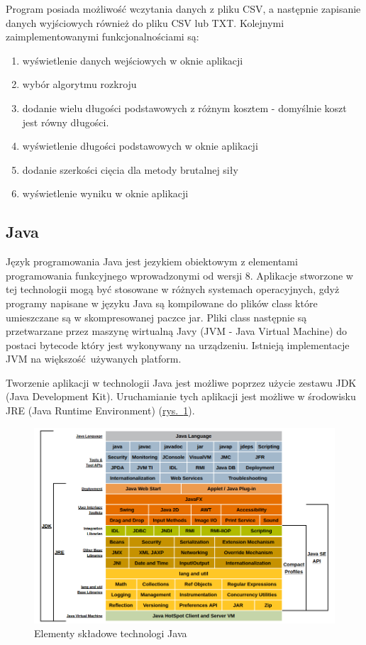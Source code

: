 Program posiada możliwość wczytania danych z pliku CSV, a następnie zapisanie danych wyjściowych również do pliku CSV lub TXT. Kolejnymi zaimplementowanymi funkcjonalnościami są:
\begin{enumerate}
  \item wyświetlenie danych wejściowych w oknie aplikacji
  \item wybór algorytmu rozkroju
  \item dodanie wielu długości podstawowych z różnym kosztem - domyślnie koszt jest równy długości.
  \item wyświetlenie długości podstawowych w oknie aplikacji
  \item dodanie szerkości cięcia dla metody brutalnej siły
  \item wyświetlenie wyniku w oknie aplikacji
\end{enumerate}

\subsection{Java}
Język programowania Java jest jezykiem obiektowym z elementami programowania funkcyjnego wprowadzonymi od wersji 8. Aplikacje stworzone w tej technologii mogą być stosowane w różnych systemach operacyjnych, gdyż programy napisane w języku Java są kompilowane do plików class które umieszczane są w skompresowanej paczce jar. Pliki class następnie są przetwarzane przez maszynę wirtualną Javy (JVM - Java Virtual Machine) do postaci bytecode który jest wykonywany na urządzeniu. Istnieją implementacje JVM na większość używanych platform.

Tworzenie aplikacji w technologii Java jest możliwe poprzez użycie zestawu JDK (Java Development Kit). Uruchamianie tych aplikacji jest możliwe w środowisku JRE (Java Runtime Environment)  (\hyperref[fig:java_arch]{rys.~\ref*{fig:java_arch}}).

\begin{figure}[h]
  \center
  \includegraphics[scale=0.4]{../image/java_arch.png}
  \caption{Elementy składowe technologi Java \cite{OracleJavaArch}}
  \label{fig:java_arch}
\end{figure}

